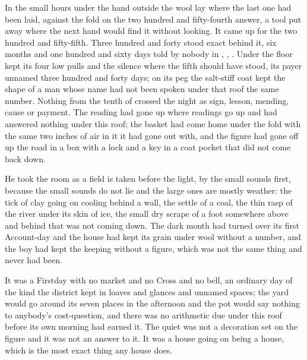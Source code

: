 
In the small hours under  the hand outside the wool lay where the last one had been laid, against the fold on the two hundred and fifty-fourth answer, a tool put away where the next hand would find it without looking. It came up for the two hundred and fifty-fifth. Three hundred and forty stood exact behind it, six months and one hundred and sixty days told by nobody in , , . Under the floor  kept its four low pulls and the silence where the fifth should have stood, its payer unnamed three hundred and forty days; on its peg the salt-stiff coat kept the shape of a man whose name had not been spoken under that roof the same number. Nothing from the tenth of  crossed the night as sign, lesson, mending, cause or payment. The reading had gone up where readings go up and had answered nothing under this roof; the basket had come home under the fold with the same two inches of air in it it had gone out with, and the figure had gone off up the road in a box with a lock and a key in a coat pocket that did not come back down.

He took the room as a field is taken before the light, by the small sounds first, because the small sounds do not lie and the large ones are mostly weather: the tick of clay going on cooling behind a wall, the settle of a coal, the thin rasp of the river under its skin of ice, the small dry scrape of a foot somewhere above and behind that was not coming down. The dark month had turned over its first Account-day and the house had kept its grain under wool without a number, and the boy had kept the keeping without a figure, which was not the same thing and never had been.

It was a Firstday with no market and no Cross and no bell, an ordinary day of the kind the district kept in loaves and glances and unnamed spaces; the yard would go around its seven places in the afternoon and the pot would say nothing to anybody's cost-question, and there was no arithmetic due under this roof before its own morning had earned it. The quiet was not a decoration set on the figure and it was not an answer to it. It was a house going on being a house, which is the most exact thing any house does.

